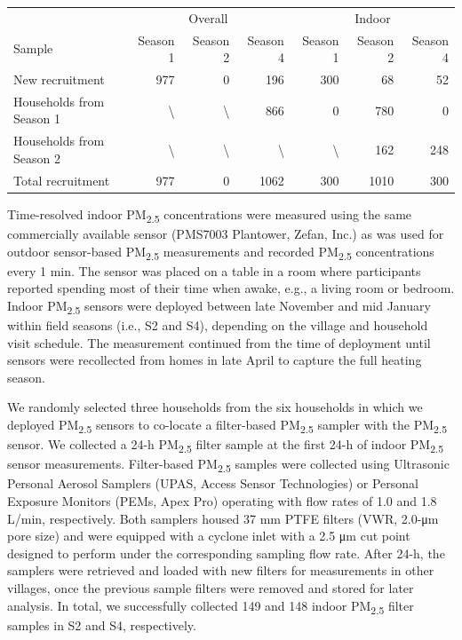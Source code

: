 \documentclass[
  letterpaper,
  DIV=11,
  numbers=noendperiod]{scrartcl}
\makeatletter
\renewenvironment{table}%
  {\renewcommand\familydefault\sfdefault
   \@float{table}}
  {\end@float}
\makeatother
\begin{document}
\hypertarget{tbl-pm-sample}{}
\begin{table}
\caption{\label{tbl-pm-sample}Household recruitment for overall and indoor air quality measurements. }\tabularnewline

\centering
\begin{tabular}{lrrrrrr}
\toprule
\multicolumn{1}{c}{ } & \multicolumn{3}{c}{Overall} & \multicolumn{3}{c}{Indoor} \\
\cmidrule(l{3pt}r{3pt}){2-4} \cmidrule(l{3pt}r{3pt}){5-7}
Sample & Season 1 & Season 2 & Season 4 & Season 1 & Season 2 & Season 4\\
\midrule
New recruitment & 977 & 0 & 196 & 300 & 68 & 52\\
Households from Season 1 & \textbackslash{} & \textbackslash{} & 866 & 0 & 780 & 0\\
Households from Season 2 & \textbackslash{} & \textbackslash{} & \textbackslash{} & \textbackslash{} & 162 & 248\\
Total recruitment & 977 & 0 & 1062 & 300 & 1010 & 300\\
\bottomrule
\end{tabular}
\end{table}

Time-resolved indoor PM\textsubscript{2.5} concentrations were measured
using the same commercially available sensor (PMS7003 Plantower, Zefan,
Inc.) as was used for outdoor sensor-based PM\textsubscript{2.5}
measurements and recorded PM\textsubscript{2.5} concentrations every 1
min. The sensor was placed on a table in a room where participants
reported spending most of their time when awake, e.g., a living room or
bedroom. Indoor PM\textsubscript{2.5} sensors were deployed between late
November and mid January within field seasons (i.e., S2 and S4),
depending on the village and household visit schedule. The measurement
continued from the time of deployment until sensors were recollected
from homes in late April to capture the full heating season.

We randomly selected three households from the six households in which
we deployed PM\textsubscript{2.5} sensors to co-locate a filter-based
PM\textsubscript{2.5} sampler with the PM\textsubscript{2.5} sensor. We
collected a 24-h PM\textsubscript{2.5} filter sample at the first 24-h
of indoor PM\textsubscript{2.5} sensor measurements. Filter-based
PM\textsubscript{2.5} samples were collected using Ultrasonic Personal
Aerosol Samplers (UPAS, Access Sensor Technologies) or Personal Exposure
Monitors (PEMs, Apex Pro) operating with flow rates of 1.0 and 1.8
L/min, respectively. Both samplers housed 37 mm PTFE filters (VWR,
2.0-μm pore size) and were equipped with a cyclone inlet with a 2.5 μm
cut point designed to perform under the corresponding sampling flow
rate. After 24-h, the samplers were retrieved and loaded with new
filters for measurements in other villages, once the previous sample
filters were removed and stored for later analysis. In total, we
successfully collected 149 and 148 indoor PM\textsubscript{2.5} filter
samples in S2 and S4, respectively.
\end{document}

